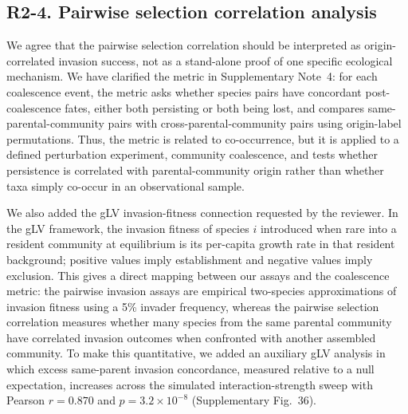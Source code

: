 \subsection*{R2-4. Pairwise selection correlation analysis}


We agree that the pairwise selection correlation should be interpreted as origin-correlated invasion success, not as a stand-alone proof of one specific ecological mechanism. We have clarified the metric in Supplementary Note~4: for each coalescence event, the metric asks whether species pairs have concordant post-coalescence fates, either both persisting or both being lost, and compares same-parental-community pairs with cross-parental-community pairs using origin-label permutations. Thus, the metric is related to co-occurrence, but it is applied to a defined perturbation experiment, community coalescence, and tests whether persistence is correlated with parental-community origin rather than whether taxa simply co-occur in an observational sample.

We also added the gLV invasion-fitness connection requested by the reviewer. In the gLV framework, the invasion fitness of species $i$ introduced when rare into a resident community at equilibrium is its per-capita growth rate in that resident background; positive values imply establishment and negative values imply exclusion. This gives a direct mapping between our assays and the coalescence metric: the pairwise invasion assays are empirical two-species approximations of invasion fitness using a 5\% invader frequency, whereas the pairwise selection correlation measures whether many species from the same parental community have correlated invasion outcomes when confronted with another assembled community. To make this quantitative, we added an auxiliary gLV analysis in which excess same-parent invasion concordance, measured relative to a null expectation, increases across the simulated interaction-strength sweep with Pearson $r = 0.870$ and $p = 3.2 \times 10^{-8}$ (Supplementary Fig.~36).

